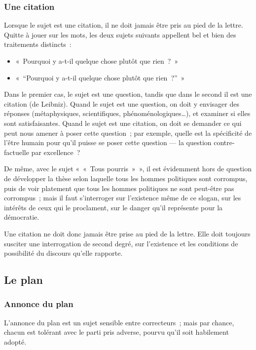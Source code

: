 \documentclass[a4paper]{article}
\begin{document}
\subsubsection{Une citation}
\label{sec-2-3-4}


Lorsque le sujet est une citation, il ne doit jamais être pris au pied
de la lettre. Quitte à jouer sur les mots, les deux sujets suivants
appellent bel et bien des traitements distincts :

\begin{itemize}
\item « Pourquoi y a-t-il quelque chose plutôt que rien ? »
\item « ``Pourquoi y a-t-il quelque chose plutôt que rien ?'' »
\end{itemize}

Dans le premier cas, le sujet est une question, tandis que dans le
second il est une citation (de Leibniz). Quand le sujet est une
question, on doit y envisager des réponses (métaphysiques,
scientifiques, phénoménologiques\ldots{}), et examiner si elles sont
satisfaisantes. Quand le sujet est une citation, on doit se demander ce
qui peut nous amener à poser cette question ; par exemple, quelle est la
spécificité de l'être humain pour qu'il puisse se poser cette question
--- la question contre-factuelle par excellence ?

De même, avec le sujet « « Tous pourris » », il est évidemment hors de
question de développer la thèse selon laquelle tous les hommes
politiques sont corrompus, puis de voir platement que tous les hommes
politiques ne sont peut-être pas corrompus ; mais il faut s'interroger
sur l'existence même de ce slogan, sur les intérêts de ceux qui le
proclament, sur le danger qu'il représente pour la démocratie.

Une citation ne doit donc jamais être prise au pied de la lettre. Elle
doit toujours susciter une interrogation de second degré, sur
l'existence et les conditions de possibilité du discours qu'elle
rapporte.
        
\subsection{Le plan}
\label{sec-2-4}
\subsubsection{Annonce du plan}
\label{sec-2-4-1}

L'annonce du plan est un sujet sensible entre correcteurs ; mais par
chance, chacun est tolérant avec le parti pris adverse, pourvu qu'il
soit habilement adopté.
\end{document}
